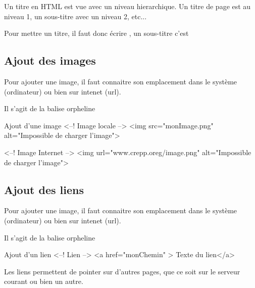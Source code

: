 Un titre en HTML est vue avec un niveau hierarchique. 
Un titre de page est au niveau 1, un sous-titre avec un niveau 2, etc...

Pour mettre un titre, il faut donc écrire , un sous-titre 
c'est \\


\subsection{Ajout des images}

Pour ajouter une image, il faut connaitre son emplacement dans le système (ordinateur) ou bien sur intenet (url).

Il s'agit de la balise orpheline 

\begin{Html}{Ajout d'une image}
<--! Image locale -->
<img src="monImage.png" alt="Impossible de charger l'image">

<--! Image Internet -->
<img url="www.crepp.oreg/image.png" alt="Impossible de charger l'image">
\end{Html}


\subsection{Ajout des liens}

Pour ajouter une image, il faut connaitre son emplacement dans le système (ordinateur) ou bien sur intenet (url).

Il s'agit de la balise orpheline 

\begin{Html}{Ajout d'un lien}
<--! Lien -->
<a href="monChemin" > Texte du lien</a>
\end{Html}
Les liens permettent de pointer sur d'autres pages, que ce soit sur le serveur courant ou bien un autre.




